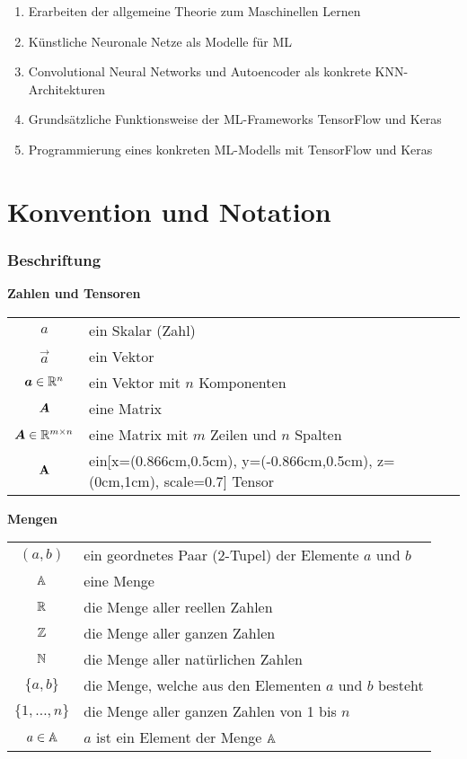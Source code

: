 \begin{enumerate}
  \item{Erarbeiten der allgemeine Theorie zum Maschinellen Lernen}
  \item{Künstliche Neuronale Netze als Modelle für ML}
  \item{Convolutional Neural Networks und Autoencoder als konkrete KNN-Architekturen}
  \item{Grundsätzliche Funktionsweise der ML-Frameworks TensorFlow und Keras}
  \item{Programmierung eines konkreten ML-Modells mit TensorFlow und Keras}
\end{enumerate}



\chapter*{Konvention und Notation}

\subsection*{Beschriftung}

\begin{center}\textbf{Zahlen und Tensoren}\end{center}
\begin{tabular}{cl}
  $a$ & ein Skalar (Zahl) \\
  $\vec{a}$ & ein Vektor \\
  $\bm{a} \in \mathbb{R}^{n}$ & ein Vektor mit $n$ Komponenten \\
  $\bm{A}$ & eine Matrix \\
  $\bm{A} \in \mathbb{R}^{m \times n}$ & eine Matrix mit $m$ Zeilen und $n$ Spalten \\
  $\mathbf{A}$ & ein[x={(0.866cm,0.5cm)}, y={(-0.866cm,0.5cm)}, z={(0cm,1cm)}, scale=0.7] Tensor \\

\end{tabular}

\begin{center}\textbf{Mengen}\end{center}
\begin{tabular}{cl}
  $(a,b)$ & ein geordnetes Paar (2-Tupel) der Elemente $a$ und $b$ \\
  $\mathbb{A}$ & eine Menge \\
  $\mathbb{R}$ & die Menge aller reellen Zahlen \\
  $\mathbb{Z}$ & die Menge aller ganzen Zahlen \\
  $\mathbb{N}$ & die Menge aller natürlichen Zahlen \\
  $\{a,b\}$ & die Menge, welche aus den Elementen $a$ und $b$ besteht \\
  $\{1,\ldots,n\}$ & die Menge aller ganzen Zahlen von 1 bis $n$ \\
  $a \in \mathbb{A}$ & $a$ ist ein Element der Menge $\mathbb{A}$ \\

\end{tabular}


